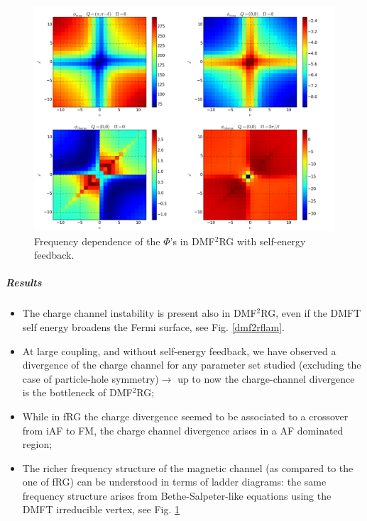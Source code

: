 \begin{figure}
\includegraphics[scale=0.25]{images/Merged_dmf2rg_se.png}
\caption{Frequency dependence of the $\Phi$'s in DMF$^2$RG with self-energy feedback.} \label{dmf2rfreq}
\end{figure}

\subparagraph{Results} 
\begin{itemize}

\item The charge channel instability is present also in DMF$^2$RG, even if the DMFT self energy broadens the Fermi surface, see Fig. \ref{dmf2rflam}.  

\item At large coupling, and without self-energy feedback, we have observed a divergence of the charge channel for any parameter set studied (excluding the case of particle-hole symmetry)$\rightarrow$ up to now the charge-channel divergence is the bottleneck of DMF$^2$RG;  

\item While in fRG the charge divergence seemed to be associated to a crossover from iAF to FM, the charge channel divergence arises in a  AF dominated region;
 
\item The richer frequency structure of the magnetic channel (as compared to the one of fRG) can be understood in terms of ladder diagrams: the same frequency structure arises from Bethe-Salpeter-like equations using the DMFT irreducible vertex, see Fig. \ref{dmf2rfreq}

\end{itemize}

